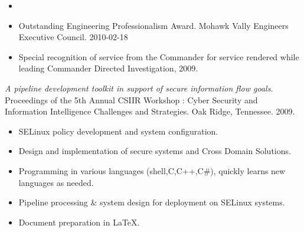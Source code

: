 \documentclass[letterpaper,11pt]{article}
\begin{document}
    \begin{itemize}
    \item[]
    \end{itemize}

    \begin {itemize}
      \setlength {\itemsep}{1pt}
      \setlength {\parskip}{0pt}
      \setlength {\parsep}{0pt}
    \item Outstanding Engineering Professionalism Award.
      Mohawk Vally Engineers Executive Council.
      2010-02-18
    \item Special recognition of service from the Commander for service rendered while leading Commander Directed Investigation, 2009.
    \end {itemize}

    {\it A pipeline development toolkit in support of secure information flow goals}.
    Proceedings of the 5th Annual CSIIR Workshop : Cyber Security and Information Intelligence Challenges and Strategies.
    Oak Ridge, Tennessee.
    2009.
    \begin {itemize}
      \setlength {\itemsep}{1pt}
      \setlength {\parskip}{0pt}
      \setlength {\parsep}{0pt}
      \item SELinux policy development and system configuration.
      \item Design and implementation of secure systems and Cross Domain Solutions.
      \item Programming in various languages (shell,C,C++,C\#), quickly learns new languages as needed.
      \item Pipeline processing \& system design for deployment on SELinux systems.
      \item Document preparation in \LaTeX.
    \end {itemize}
\end{document}
